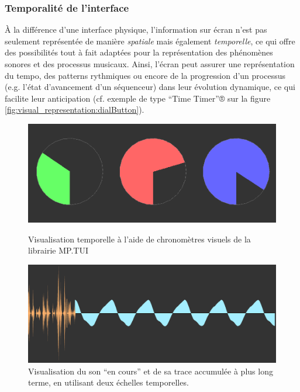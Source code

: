 \subsubsection{Temporalité de l'interface} 

\noindent À la différence d'une interface physique, l'information sur écran n'est pas seulement représentée de manière \textit{spatiale} mais également \textit{temporelle}, ce qui offre des possibilités tout à fait adaptées pour la représentation des phénomènes sonores et des processus musicaux. Ainsi, l'écran peut assurer une représentation du tempo, des patterns rythmiques ou encore de la progression d'un processus (e.g. l'état d'avancement d'un séquenceur) dans leur évolution dynamique, ce qui facilite leur anticipation (cf. exemple de type ``Time Timer''® sur la figure \ref{fig:visual_representation:dialButton}).\\
\begin{figure}[!htbp]
	\captionsetup{format=plain}%
	\centering
	\begin{minipage}[t]{0.48\textwidth}
		\includegraphics[width=\linewidth]{gfx/06_visual_representation/mpTUI-DialButton.png}
		\caption[Visualisation temporelle à l'aide de chronomètres visuels]{Visualisation temporelle à l'aide de chronomètres visuels de la librairie MP.TUI}
		\label{fig:visual_representation:dialButton}
	\end{minipage}
	\hspace{.02\linewidth}
	\begin{minipage}[t]{0.48\textwidth}
	    \includegraphics[width=\linewidth]{gfx/06_visual_representation/LAM-DSW.png}
		\caption[Deux échelles temporelles différentes d'un flux audio]{Visualisation du son ``en cours'' et de sa trace accumulée à plus long terme, en utilisant deux échelles temporelles.}
		\label{fig:visual_representation:DSW}
	\end{minipage}
\end{figure}
